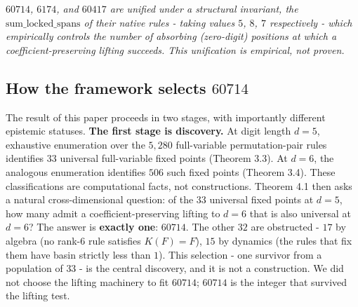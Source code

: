 \documentclass[11pt,letterpaper]{article}
\theoremstyle{paperstyle}
\theoremstyle{paperstyledef}
\theoremstyle{paperstylerem}
\begin{document}
\emph{\(60714\), \(6174\), and \(60417\) are unified under a structural
invariant, the \(\mathrm{sum\_locked\_spans}\) of their native rules -
taking values \(5\), \(8\), \(7\) respectively - which empirically
controls the number of absorbing (zero-digit) positions at which a
coefficient-preserving lifting succeeds. This unification is empirical,
not proven.}

\hypertarget{how-the-framework-selects-60714}{%
\subsection{\texorpdfstring{How the framework selects \(60714\)}{How the framework selects 60714}}\label{how-the-framework-selects-60714}}

The result of this paper proceeds in two stages, with importantly
different epistemic statuses. \textbf{The first stage is discovery.} At
digit length \(d = 5\), exhaustive enumeration over the \(5{,}280\)
full-variable permutation-pair rules identifies \(33\) universal
full-variable fixed points (Theorem 3.3). At \(d = 6\), the analogous
enumeration identifies \(506\) such fixed points (Theorem 3.4). These
classifications are computational facts, not constructions. Theorem 4.1
then asks a natural cross-dimensional question: of the \(33\) universal
fixed points at \(d = 5\), how many admit a coefficient-preserving
lifting to \(d = 6\) that is also universal at \(d = 6\)? The answer is
\textbf{exactly one}: \(60714\). The other \(32\) are obstructed -
\(17\) by algebra (no rank-\(6\) rule satisfies \(K(F) = F\)), \(15\) by
dynamics (the rules that fix them have basin strictly less than \(1\)).
This selection - one survivor from a population of \(33\) - is the
central discovery, and it is not a construction. We did not choose the
lifting machinery to fit \(60714\); \(60714\) is the integer that
survived the lifting test.
\end{document}
